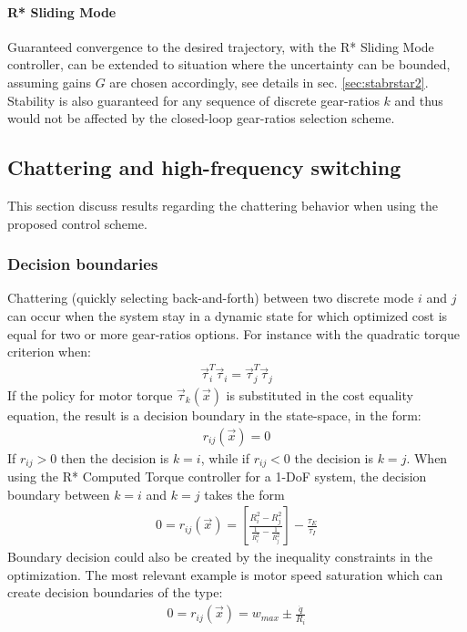 \paragraph{R* Sliding Mode} Guaranteed convergence to the desired trajectory, with the R* Sliding Mode controller, can be extended to situation where the uncertainty can be bounded, assuming gains $G$ are chosen accordingly, see details in sec. \ref{sec:stabrstar2}. Stability is also guaranteed for any sequence of discrete gear-ratios $k$ and thus would not be affected by the closed-loop gear-ratios selection scheme.


\subsection{Chattering and high-frequency switching}

This section discuss results regarding the chattering behavior when using the proposed control scheme. 

\subsubsection{Decision boundaries}

Chattering (quickly selecting back-and-forth) between two discrete mode $i$ and $j$ can occur when the system stay in a dynamic state for which optimized cost is equal for two or more gear-ratios options. For instance with the quadratic torque criterion when:
%
\begin{align}
\vec{\tau}_i^T \vec{\tau}_i = \vec{\tau}_j^T \vec{\tau}_j
\end{align}
%
If the policy for motor torque $\vec{\tau}_k(\vec{x})$ is substituted in the cost equality equation, the result is a decision boundary in the state-space, in the form:
%
\begin{align}
r_{ij} ( \vec{x} ) = 0
\end{align}
%
If $r_{ij}>0$ then the decision is $k=i$, while if $r_{ij}<0$ the decision is $k=j$. When using the R* Computed Torque controller for a 1-DoF system, the decision boundary between $k=i$ and $k=j$ takes the form
%
\begin{align}
0 = r_{ij} ( \vec{x} )  = \left[ \frac{R_i^2-R_j^2}{\frac{1}{R_i^2}-\frac{1}{R_j^2}}\right] - \frac{\tau_E}{\tau_I}
\end{align}
%
Boundary decision could also be created by the inequality constraints in the optimization. The most relevant example is motor speed saturation which can create decision boundaries of the type:
%
\begin{align}
0 = r_{ij} ( \vec{x} )  = w_{max} \pm \frac{\dot{q}}{R_i}
\end{align}
%

